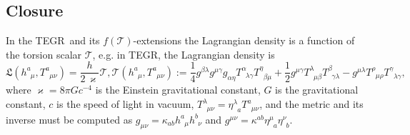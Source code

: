 \documentclass[
10pt, %
a4paper, %
oneside, %
headinclude,footinclude, %
BCOR5mm, %
]{scrartcl}
\newcommand{\mg}[1]{\kappa_{#1}}			%
\newcommand{\MG}[1]{\kappa^{#1}}			%
\newcommand{\tetrsymbol}{h}
\newcommand{\itetrsymbol}{\eta}
\newcommand{\itetr}[2]{\itetrsymbol^{#1}_{\phantom{#1}#2}}
\newcommand{\tetr}[2]{\tetrsymbol^{#1}_{\phantom{#1}#2}}
\newcommand{\detTetr}{\tetrsymbol}
\newcommand{\Tors}[2]{T^{#1}_{\phantom{a}#2}}
\newcommand{\Laghodge}{L}%
\newcommand{\Lagtors}{\mathfrak{L}}%
\newcommand{\tegr}{TEGR}
\newcommand{\HDT}[1]{\accentset{\star}{T}^{#1}}
\newcommand{\HDmix}{\accentset{\star}{T}}
\newcommand{\Tscal}{\mathcal{T}}		%
\begin{document}
\subsection{Closure}\label{sec.closure}



In the \tegr\ and its $ f(\Tscal) $-extensions the Lagrangian density is a function of the 
torsion scalar $ \Tscal $, e.g. in \tegr, the Lagrangian density is
\begin{subequations}\label{eqn.TEGR.Lagr}
	\begin{equation}
		\Lagtors(\tetr{a}{\mu},\Tors{a}{\mu\nu}) = \frac{\detTetr}{2 \, \varkappa} \Tscal,
	\end{equation}
	\begin{equation}\label{eqn.tors.scal0}
		\Tscal(\tetr{a}{\mu},\Tors{a}{\mu\nu}) := 
		\frac14 g^{\beta\lambda} g^{\mu\gamma} g_{\alpha\eta} \Tors{\alpha}{\lambda\gamma}
		\Tors{\eta}{\beta\mu} +
		\frac12 g^{\mu\gamma} \Tors{\lambda}{\mu\beta} \Tors{\beta}{\gamma\lambda} - 
		g^{\mu\lambda} \Tors{\rho}{\mu\rho} \Tors{\gamma}{\lambda\gamma},	  
	\end{equation}
\end{subequations}
where $ \varkappa = 8\pi G c^{-4} $ is the Einstein gravitational constant, $ G $ is the 
gravitational constant, $ c $ is the speed of light in vacuum, $ 
\Tors{\lambda}{\mu\nu} = 
\itetr{\lambda}{a} \Tors{a}{\mu\nu} $, and the metric and its 
inverse must be computed as $ g_{\mu\nu} = 
\mg{ab}\tetr{a}{\mu}\tetr{b}{\nu} $ and $ g^{\mu\nu} = \MG{ab}\itetr{\mu}{a}\itetr{\nu}{b}$.





\end{document}
